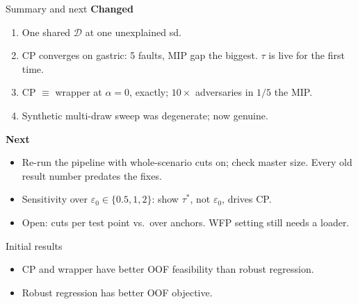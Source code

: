 \documentclass{beamer}
\begin{document}
\begin{frame}{Summary and next}
  \small
  \textbf{Changed}
  \begin{enumerate}
    \item One shared $\mathcal D$ at one unexplained sd.
    \item CP converges on gastric: 5 faults, MIP gap the biggest. $\tau$ is live for
      the first time.
    \item CP $\equiv$ wrapper at $\alpha=0$, exactly; $10\times$ adversaries in $1/5$
      the MIP.
    \item Synthetic multi-draw sweep was degenerate; now genuine.
  \end{enumerate}
  \medskip
  \textbf{Next}
  \begin{itemize}
    \item Re-run the pipeline with whole-scenario cuts on; check master size.
      Every old result number predates the fixes.
    \item Sensitivity over $\varepsilon_0\in\{0.5,1,2\}$: show $\tau^\ast$, not
      $\varepsilon_0$, drives CP.
    \item Open: cuts per test point vs.\ over anchors. WFP setting still needs a
      loader.
  \end{itemize}
\end{frame}

\begin{frame}{Initial results}
  \small
  \begin{itemize}
    \item CP and wrapper have better OOF feasibility than robust regression.
    \item Robust regression has better OOF objective.
  \end{itemize}
\end{frame}
\end{document}
